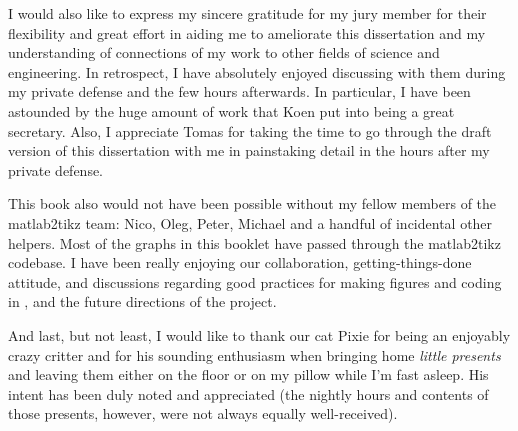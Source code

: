 I would also like to express my sincere gratitude for my jury member for their flexibility and great effort in aiding me to ameliorate this dissertation and my understanding of connections of my work to other fields of science and engineering.
In retrospect, I have absolutely enjoyed discussing with them during my private defense and the few hours afterwards.
In particular, I have been astounded by the huge amount of work that Koen put into being a great secretary.
Also, I appreciate Tomas for taking the time to go through the draft version of this dissertation with me in painstaking detail in the hours after my private defense.

This book also would not have been possible without my fellow members of the matlab2tikz team: Nico, Oleg, Peter, Michael and a handful of incidental other helpers.
Most of the graphs in this booklet have passed through the matlab2tikz codebase.
I have been really enjoying our collaboration, getting-things-done attitude, and discussions regarding good practices for making figures and coding in \MATLAB{}, and the future directions of the project.



And last, but not least, I would like to thank our cat Pixie for being an enjoyably crazy critter and for his sounding enthusiasm when bringing home \emph{little presents} and leaving them either on the floor or on my pillow while I'm fast asleep.
His intent has been duly noted and appreciated (the nightly hours and contents of those presents, however, were not always equally well-received).
